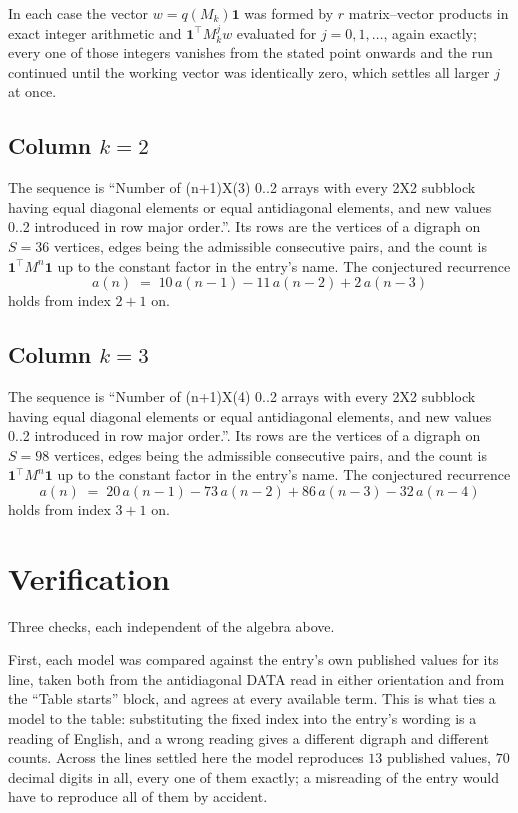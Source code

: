 \documentclass[11pt,a4paper]{article}
\theoremstyle{plain}
\theoremstyle{definition}
\begin{document}
In each case the vector $w=q(M_k)\mathbf{1}$ was formed by $r$ matrix--vector products in
exact integer arithmetic and $\mathbf{1}^{\!\top}M_k^{j}w$ evaluated for $j=0,1,\dots$,
again exactly; every one of those integers vanishes from the stated point onwards and the run
continued until the working vector was identically zero, which settles all larger $j$ at once.

\subsection*{Column $k$$=2$}
The sequence is ``Number of (n+1)X(3) 0..2 arrays with every 2X2 subblock having equal diagonal elements or equal antidiagonal elements, and new values 0..2 introduced in row major order.''. Its rows are the vertices of a digraph on
$S=36$ vertices, edges being the admissible consecutive pairs, and the count is
$\mathbf{1}^{\!\top}M^{n}\mathbf{1}$ up to the constant factor in the entry's name.
The conjectured recurrence
\[
a(n)\;=\;10\,a(n-1) - 11\,a(n-2) + 2\,a(n-3)
\]
holds from index $2+1$ on.

\subsection*{Column $k$$=3$}
The sequence is ``Number of (n+1)X(4) 0..2 arrays with every 2X2 subblock having equal diagonal elements or equal antidiagonal elements, and new values 0..2 introduced in row major order.''. Its rows are the vertices of a digraph on
$S=98$ vertices, edges being the admissible consecutive pairs, and the count is
$\mathbf{1}^{\!\top}M^{n}\mathbf{1}$ up to the constant factor in the entry's name.
The conjectured recurrence
\[
a(n)\;=\;20\,a(n-1) - 73\,a(n-2) + 86\,a(n-3) - 32\,a(n-4)
\]
holds from index $3+1$ on.

\section{Verification}

Three checks, each independent of the algebra above.

First, each model was compared against the entry's own published values for its line, taken
both from the antidiagonal DATA read in either orientation and from the ``Table starts''
block, and agrees at every available term. This is what ties a model to the table:
substituting the fixed index into the entry's wording is a reading of English, and a wrong
reading gives a different digraph and different counts. Across the lines settled here the
model reproduces $13$ published values, $70$ decimal digits in all, every one of
them exactly; a misreading of the entry would have to reproduce all of them by accident.
\end{document}
